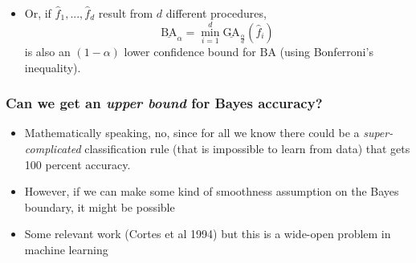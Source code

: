 \documentclass{beamer}
\begin{document}
\begin{frame}
\begin{center}
\begin{tabular}{ccc}
\end{tabular}
\end{center}
\begin{itemize}
\item Or, if $\hat{f}_1,...,\hat{f}_d$ result from $d$ different procedures,
\[
\underline{\text{BA}}_\alpha = \min_{i=1}^d \underline{\text{GA}}_{\frac{\alpha}{d}}(\hat{f}_i)
\]
is also an $(1-\alpha)$ lower confidence bound for $\text{BA}$ (using Bonferroni's inequality).
\end{itemize}
\end{frame}

\begin{frame}
\frametitle{Can we get an \emph{upper bound} for Bayes accuracy?}
\begin{itemize}
\item Mathematically speaking, no, since for all we know there could be a \emph{super-complicated} classification rule (that is impossible to learn from data) that gets 100 percent accuracy. \pause
\item However, if we can make some kind of smoothness assumption on the Bayes boundary, it might be possible \pause
\item Some relevant work (Cortes et al 1994) but this is a wide-open problem in machine learning
\end{itemize}
\end{frame}
\end{document}
